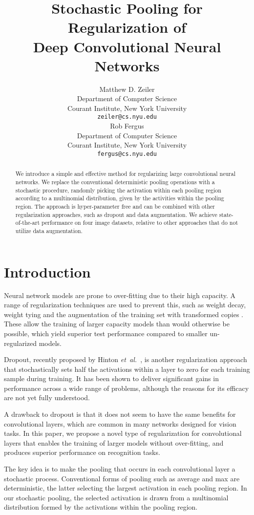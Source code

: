 \documentclass{article} \usepackage{nips12submit_e,times}
\title{Stochastic Pooling for Regularization of \\ Deep Convolutional Neural Networks}
\author{
Matthew D. Zeiler \\
Department of Computer Science \\
Courant Institute, New York University \\
\texttt{zeiler@cs.nyu.edu} \\
\And
Rob Fergus \\
Department of Computer Science \\
Courant Institute, New York University \\
\texttt{fergus@cs.nyu.edu} \\
}
\def\etal{{\textit{et~al.~}}}
\begin{document}
\maketitle

\begin{abstract}
  We introduce a simple and effective method for regularizing large
  convolutional neural networks. We replace the conventional
  deterministic pooling operations with a stochastic procedure,
  randomly picking the activation within each pooling region according
  to a multinomial distribution, given by the activities within the
  pooling region. The approach is hyper-parameter free and can be
  combined with other regularization approaches, such as dropout and
  data augmentation. We achieve state-of-the-art performance on four
  image datasets, relative to other approaches that do not utilize
  data augmentation.
\end{abstract}

\section{Introduction}

Neural network models are prone to over-fitting due to their high
capacity. A range of regularization techniques are used to prevent
this, such as weight decay, weight tying and the augmentation of the
training set with transformed copies \cite{NNtricks}. These allow the
training of larger capacity models than would otherwise be possible,
which yield superior test performance compared to smaller un-regularized models.

Dropout, recently proposed by Hinton \etal \cite{Hinton12}, is another
regularization approach that stochastically sets half the activations
within a layer to zero for each training sample during training. It
has been shown to deliver significant gains in performance across a
wide range of problems, although the reasons for its efficacy are not
yet fully understood.

A drawback to dropout is that it does not seem to have the same
benefits for convolutional layers, which are common in many networks
designed for vision tasks.  In this paper, we propose a novel type of
regularization for convolutional layers that enables the training of
larger models without over-fitting, and produces superior performance
on recognition tasks.

The key idea is to make the pooling that occurs in each convolutional
layer a stochastic process. Conventional forms of pooling such as
average and max are deterministic, the latter selecting the largest
activation in each pooling region. In our stochastic pooling, the
selected activation is drawn from a multinomial distribution
formed by the activations within the pooling region.
\end{document}
